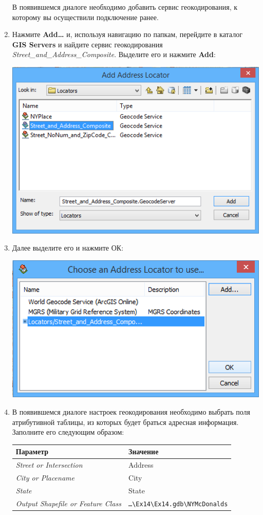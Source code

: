 \documentclass[]{book}
\theoremstyle{definition}
\theoremstyle{definition}
\theoremstyle{definition}
\theoremstyle{remark}
\begin{document}
\begin{enumerate}
  В появившемся диалоге необходимо добавить сервис геокодирования, к
  которому вы осуществили подключение ранее.
\item
  Нажмите \textbf{Add\ldots{}} и, используя навигацию по папкам,
  перейдите в каталог \textbf{GIS Servers} и найдите сервис
  геокодирования \emph{Street\_and\_Address\_Composite}. Выделите его и
  нажмите \textbf{Add}:

  \includegraphics{images/Ex14/image11.png}
\item
  Далее выделите его и нажмите ОК:

  \includegraphics{images/Ex14/image12.png}
\item
  В появившемся диалоге настроек геокодирования необходимо выбрать поля
  атрибутивной таблицы, из которых будет браться адресная информация.
  Заполните его следующим образом:

  \begin{longtable}[]{@{}ll@{}}
  \toprule
  Параметр & Значение\tabularnewline
  \midrule
  \endhead
  \emph{Street or Intersection} & Address\tabularnewline
  \emph{City or Placename} & City\tabularnewline
  \emph{State} & State\tabularnewline
  \emph{Output Shapefile or Feature Class} &
  \texttt{\ldots{}\textbackslash{}Ex14\textbackslash{}Ex14.gdb\textbackslash{}NYMcDonalds}\tabularnewline
  \bottomrule
  \end{longtable}


\end{enumerate}
\end{document}
